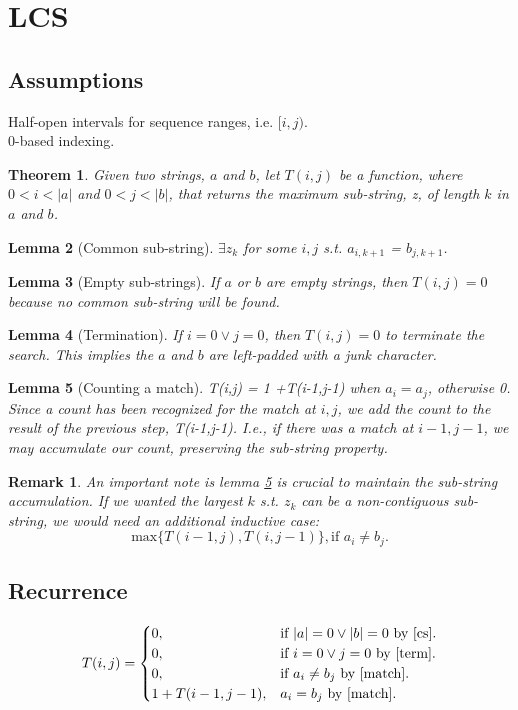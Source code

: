 \documentclass{article}
\newtheorem{theorem}{Theorem}[section]
\newtheorem{lemma}[theorem]{Lemma}
\newtheorem{remark}{Remark}
\begin{document}
	
	\section{LCS}
	\subsection{Assumptions}
	Half-open intervals for sequence ranges, i.e. $[i,j)$.\\
	0-based indexing.
	\begin{theorem}
	Given two strings, $a$ and $b$, let $T(i, j)$ be a function, where $0 < i < |a|$ and $0 < j < |b|$, that returns the 
	maximum sub-string, z, of length $k$ in $a$ and $b$.
	\end{theorem}
	
	\begin{lemma} [Common sub-string]
	\label{zk}	
	$\exists z_k$ for some $i, j$ s.t. $a_{i, k+1}$ = $b_{j, k+1}$.
	\end{lemma}
	
	\begin{lemma} [Empty sub-strings]
	\label{cs}	
	If $a$ or $b$ are empty strings, then $T(i,j)=0$ because no common sub-string will be found.
	\end{lemma}
	
	\begin{lemma} [Termination]
	\label{term}	
	If $i=0 \vee j=0$, then $T(i,j)=0$ to terminate the search. This implies the $a$ and $b$ are left-padded with a junk character.
	\end{lemma}
	
	\begin{lemma} [Counting a match]
	\label{match}	
	T(i,j) = 1 +T(i-1,j-1) when  $a_i = a_j$, otherwise 0. Since a count has been recognized for the match at $i, j$, we add the count to the result of the previous step, T(i-1,j-1). I.e.,
	if there was a match at $i-1, j-1$, we may accumulate our count, preserving the sub-string property.
	\end{lemma}
	
	\begin{remark}
	An important note is lemma \ref{match} is crucial to maintain the sub-string accumulation. If we wanted the largest $k$ s.t. $z_k$ can be a non-contiguous sub-string, we would need
	an additional inductive case:
	$$\text{max}\{T(i-1,j), T(i,j-1)\}, \text{if $a_i \neq b_j$.}$$
	\end{remark}
	
	\subsection{Recurrence}
	 \begin{equation}
	T(i, j)=			
	\begin{cases}
	0, & \text{if $|a|=0 \vee |b|=0$ by \ref{cs}}.\\
	0, & \text{if $i=0 \vee j=0$ by \ref{term}}.\\	
	0, & \text{if } a_i \neq b_j \text{ by \ref{match}}.\\
	1+T(i-1,j-1), & \text{$a_i = b_j$ by \ref{match}}.				
	\end{cases}
	\end{equation}
\end{document}
